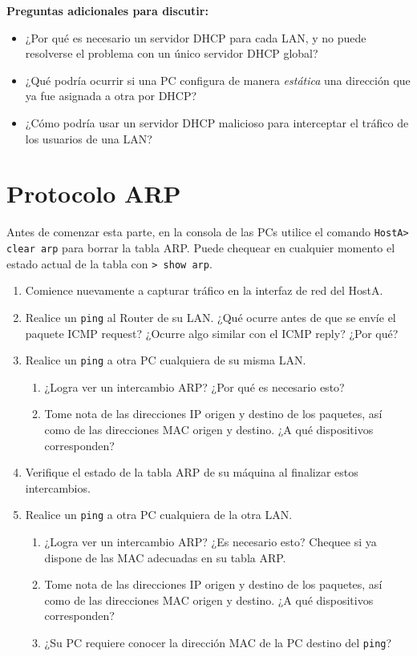\documentclass[a4paper,10pt]{article}
\begin{document}
\bigskip
\textbf{Preguntas adicionales para discutir:}

\begin{itemize}
    \item ¿Por qué es necesario un servidor DHCP para cada LAN, y no puede resolverse el problema con un único servidor DHCP global?
    \item ¿Qué podría ocurrir si una PC configura de manera \emph{estática} una dirección que ya fue asignada a otra por DHCP?
    \item ¿Cómo podría usar un servidor DHCP malicioso para interceptar el tráfico de los usuarios de una LAN?
\end{itemize}

\section{Protocolo ARP}

Antes de comenzar esta parte, en la consola de las PCs utilice el comando \texttt{HostA> clear arp} para borrar la tabla ARP. Puede chequear en cualquier momento el estado actual de la tabla con \texttt{> show arp}.

\begin{enumerate}
    \item Comience nuevamente a capturar tráfico en la interfaz de red del HostA.
    \item Realice un \texttt{ping} al Router de su LAN. ¿Qué ocurre antes de que se envíe el paquete ICMP request? ¿Ocurre algo similar con el ICMP reply? ¿Por qué?
    \item Realice un \texttt{ping} a otra PC cualquiera de su misma LAN.
        \begin{enumerate}
            \item ¿Logra ver un intercambio ARP? ¿Por qué es necesario esto?
            \item Tome nota de las direcciones IP origen y destino de los paquetes, así como de las direcciones MAC origen y destino. ¿A qué dispositivos corresponden?
        \end{enumerate}
    \item Verifique el estado de la tabla ARP de su máquina al finalizar estos intercambios.
    \item Realice un \texttt{ping} a otra PC cualquiera de la otra LAN.
        \begin{enumerate}
            \item ¿Logra ver un intercambio ARP? ¿Es necesario esto? Chequee si ya dispone de las MAC adecuadas en su tabla ARP.
            \item Tome nota de las direcciones IP origen y destino de los paquetes, así como de las direcciones MAC origen y destino. ¿A qué dispositivos corresponden?
            \item ¿Su PC requiere conocer la dirección MAC de la PC destino del \texttt{ping}?
        \end{enumerate}
\end{enumerate}
\end{document}
